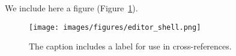 We include here a figure (Figure~\ref{fig:editor_shell}).

\begin{figure}
\begin{center}
\texttt{[image: images/figures/editor\_shell.png]}
\end{center}
\caption{The caption includes a label for use in cross-references.\label{fig:editor_shell}}
\end{figure}
